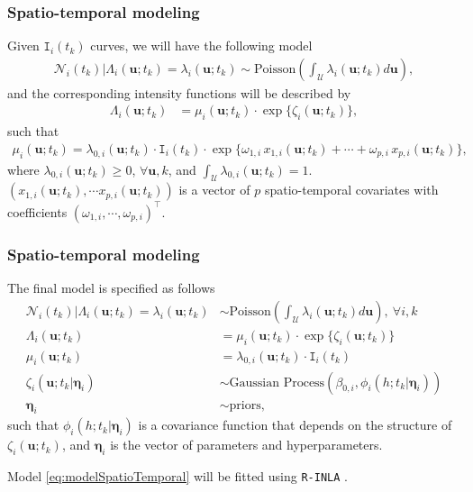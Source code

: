 \documentclass[12pt, aspectratio = 169]{beamer} %
\begin{document}
	\begin{frame}[t]
		\frametitle{Spatio-temporal modeling}
		\justifying
		
		Given $\texttt{I}_i(t_k)$ curves, we will have the following model
		\begin{align*}
			\mathcal{N}_i(t_k)|\Lambda_i(\mathbf{u}; t_k) = \lambda_i(\mathbf{u}; t_k) \sim \text{Poisson}\left(\int_{\mathcal{U}}\lambda_i(\mathbf{u}; t_k)d\mathbf{u}\right),
		\end{align*}
		and the corresponding intensity functions will be described by
		\begin{align} \label{eq:Lambda}
			\Lambda_i(\mathbf{u}; t_k) &= \mu_i(\textbf{u}; t_k) \cdot \exp\{\zeta_i(\mathbf{u}; t_k)\},
		\end{align}
		such that
		\begin{align} \label{eq:muALT}
			\mu_i(\mathbf{u}; t_k) = \lambda_{0, i}(\mathbf{u}; t_k) \cdot \texttt{I}_i(t_k) \cdot \exp\{\omega_{1, i} \, x_{1, i}(\mathbf{u}; t_k) + \cdots + \omega_{p, i} \, x_{p, i}(\mathbf{u}; t_k)\},
		\end{align}
		where $\lambda_{0, i}(\mathbf{u}; t_k) \geq 0$, $\forall \mathbf{u}, k$, and  $\int_{\mathcal{U}}\lambda_{0, i}(\mathbf{u}; t_k) = 1$. $(x_{1, i}(\mathbf{u}; t_k), \cdots x_{p, i}(\mathbf{u}; t_k))$ is a vector of $p$ spatio-temporal covariates with coefficients $(\omega_{1, i}, \cdots, \omega_{p, i})^{\top}$.
	\end{frame}
		
	\begin{frame}[t]
		\frametitle{Spatio-temporal modeling}
		\justifying
		
		The final model is specified as follows
		\begin{align} \label{eq:modelSpatioTemporal}
			\mathcal{N}_i(t_k)|\Lambda_i(\mathbf{u}; t_k) = \lambda_i(\mathbf{u}; t_k) &\sim \text{Poisson}\left(\int_{\mathcal{U}}\lambda_i(\mathbf{u}; t_k)d\mathbf{u}\right), ~\forall i, k \\
			\Lambda_i(\mathbf{u}; t_k) &= \mu_i(\mathbf{u}; t_k) \cdot \exp\{\zeta_i({\mathbf{u}; t_k})\} \nonumber \\
			\mu_i(\mathbf{u}; t_k) &= \lambda_{0, i}(\mathbf{u}; t_k) \cdot \texttt{I}_i(t_k) \nonumber \\ 
			\zeta_i(\mathbf{u}; t_k | \boldsymbol{\eta}_i) &\sim \text{Gaussian Process} (\beta_{0, i}, \phi_i(h; t_k | \boldsymbol{\eta}_i)) \nonumber \\
			\boldsymbol{\eta}_i &\sim \text{priors}, \nonumber
		\end{align}
		such that $\phi_i(h; t_k | \boldsymbol{\eta}_i)$ is a covariance function that depends on the structure of $\zeta_i(\mathbf{u}; t_k)$, and $\boldsymbol{\eta}_i$ is the vector of parameters and hyperparameters.
		
		Model \eqref{eq:modelSpatioTemporal}  will be fitted using \texttt{R-INLA} \citep{rue2009approximate}. 
	\end{frame}
		
\end{document}
